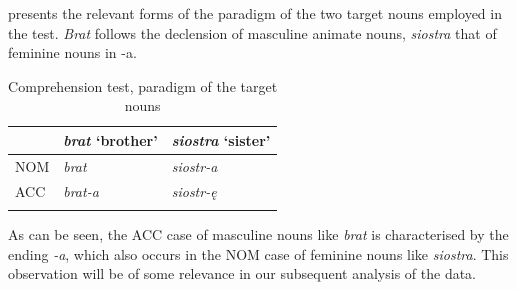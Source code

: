 \begin{table}
    \caption{Comprehension test, example of target sentences with the verb woła}
    \label{tab:02:14}
\end{table}

 presents the relevant forms of the paradigm of the two target nouns employed in the test. \textit{Brat} follows the declension of masculine animate nouns, \textit{siostra} that of feminine nouns in -a.

\begin{table}
    \begin{tabularx}{\textwidth}{XXl}
    \lsptoprule
           & \textit{brat} ‘brother’ & \textit{siostra} ‘sister’\\
    \midrule
        NOM & \textit{brat} & \textit{siostr-a}\\
        ACC & \textit{brat-a} & \textit{siostr-ę}\\
    \lspbottomrule
    \end{tabularx}
    \caption{Comprehension test, paradigm of the target nouns}
    \label{tab:02:15}
\end{table}

As can be seen, the ACC case of masculine nouns like \textit{brat} is characterised by the ending \textit{{}-a}, which also occurs in the NOM case of feminine nouns like \textit{siostra}. This observation will be of some relevance in our subsequent analysis of the data.

